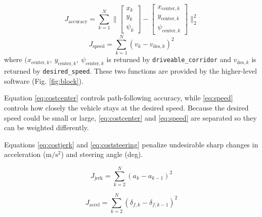 \documentclass[letterpaper, 10 pt, conference]{ieeeconf}  %
\begin{document}
 \begin{equation}
 J_{\text{accuracy}} = \sum_{k=1}^N\big\| \begin{bmatrix}
 x_k\\y_k\\\psi_k
 \end{bmatrix} - \begin{bmatrix}
 x_{\text{center},k}\\y_{\text{center},k}\\\psi_{\text{center},k}
 \end{bmatrix} \big\|_2^2
 \label{eq:costcenter}
 \end{equation}
  \begin{equation}
 J_{\text{speed}} = \sum_{k=1}^N (v_k - v_{\text{des},k})^2
 \label{eq:speed}
 \end{equation}
 where $(x_{\text{center},k},\ y_{\text{center},k},\ \psi_{\text{center},k}$ is returned by \texttt{driveable\_corridor} and $v_{\text{des},k}$ is returned by \texttt{desired\_speed}. These two functions are provided by the higher-level software (Fig. \ref{fig:block}).
 
 
 
 Equation \eqref{eq:costcenter} controls path-following accuracy, while \eqref{eq:speed} controls how closely the vehicle stays at the desired speed. Because the desired speed could be small or large, \eqref{eq:costcenter} and \eqref{eq:speed} are separated so they can be weighted differently.
 
 
 Equations \eqref{eq:costjerk} and \eqref{eq:coststeering} penalize undesirable sharp changes in acceleration ($\text{m}/\text{s}^2$) and steering angle (deg).
 
 \begin{equation}
 J_{\text{jerk}} = \sum_{k=2}^N (a_k - a_{k-1})^2
 \label{eq:costjerk}
 \end{equation}
 
 \begin{equation}
 J_{\text{accel}} = \sum_{k=2}^N (\delta_{f,k} - \delta_{f,k-1})^2
 \label{eq:coststeering}
 \end{equation}
 
\end{document}
